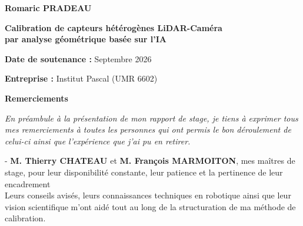 \documentclass[12pt,a4paper,oneside]{report}
\begin{document}
\begin{titlepage}
    {\large \textbf{Romaric PRADEAU} \par}
    \vspace{0.8cm}
    {\LARGE \textbf{Calibration de capteurs hétérogènes LiDAR-Caméra \\ par analyse géométrique basée sur l'IA} \par}
    
    \vfill
    
    \begin{flushleft}
        \large
        \textbf{Date de soutenance :} Septembre 2026 \par
        \vspace{0.2cm}
        \textbf{Entreprise :} Institut Pascal (UMR 6602)
    \end{flushleft}
    
\end{titlepage}

\thispagestyle{empty} %


\begin{center}
    {\Huge\bfseries Remerciements}   
\end{center}
\thispagestyle{empty} %

\vspace{3cm}

\textit{En préambule à la présentation de mon rapport de stage, je tiens à exprimer tous mes remerciements à toutes les personnes qui ont permis le bon déroulement de celui-ci ainsi que l'expérience que j'ai pu en retirer.}\vspace{2cm}

- \textbf{M. Thierry CHATEAU} et \textbf{M. François MARMOITON}, mes maîtres de stage, pour leur disponibilité constante, leur patience et la pertinence de leur encadrement \\
Leurs conseils avisés, leurs connaissances techniques en robotique ainsi que leur vision scientifique m'ont aidé tout au long de la structuration de ma méthode de calibration.\vspace{0.5cm}
\end{document}
